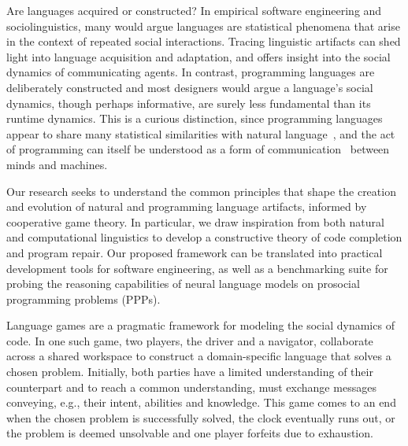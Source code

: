 \documentclass[sigplan,screen]{acmart}
\begin{document}

Are languages acquired or constructed? In empirical software engineering and sociolinguistics, many would argue languages are statistical phenomena that arise in the context of repeated social interactions. Tracing linguistic artifacts can shed light into language acquisition and adaptation, and offers insight into the social dynamics of communicating agents. In contrast, programming languages are deliberately constructed and most designers would argue a language's social dynamics, though perhaps informative, are surely less fundamental than its runtime dynamics. This is a curious distinction, since programming languages appear to share many statistical similarities with natural language~\cite{hindle2016naturalness}, and the act of programming can itself be understood as a form of communication~\cite{demillo1979social} between minds and machines.

Our research seeks to understand the common principles that shape the creation and evolution of natural and programming language artifacts, informed by cooperative game theory. In particular, we draw inspiration from both natural and computational linguistics to develop a constructive theory of code completion and program repair. Our proposed framework can be translated into practical development tools for software engineering, as well as a benchmarking suite for probing the reasoning capabilities of neural language models on prosocial programming problems (PPPs).

Language games are a pragmatic framework for modeling the social dynamics of code. In one such game, two players, the driver and a navigator, collaborate across a shared workspace to construct a domain-specific language that solves a chosen problem. Initially, both parties have a limited understanding of their counterpart and to reach a common understanding, must exchange messages conveying, e.g., their intent, abilities and knowledge. This game comes to an end when the chosen problem is successfully solved, the clock eventually runs out, or the problem is deemed unsolvable and one player forfeits due to exhaustion.
\end{document}
